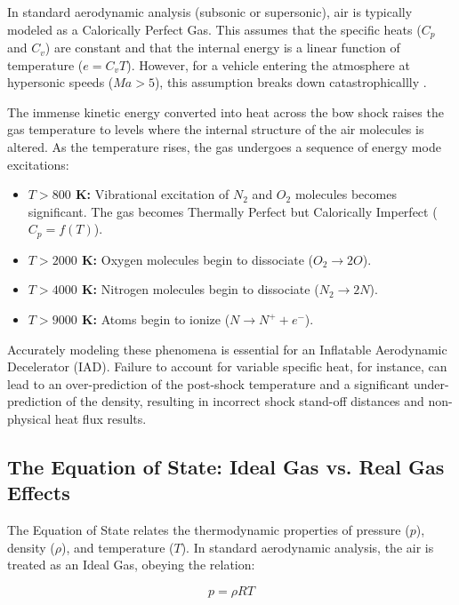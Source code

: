 \par
In standard aerodynamic analysis (subsonic or supersonic), air is typically modeled as a Calorically Perfect Gas. This assumes that the specific heats ($C_p$ and $C_v$) are constant and that the internal energy is a linear function of temperature ($e = C_v T$). However, for a vehicle entering the atmosphere at hypersonic speeds ($Ma > 5$), this assumption breaks down catastrophicallly \cite{AndersonHypersonic}.
\par
The immense kinetic energy converted into heat across the bow shock raises the gas temperature to levels where the internal structure of the air molecules is altered. As the temperature rises, the gas undergoes a sequence of energy mode excitations:
\begin{itemize}
    \item \textbf{$T > 800$ K:} Vibrational excitation of $N_2$ and $O_2$ molecules becomes significant. The gas becomes Thermally Perfect but Calorically Imperfect ($C_p = f(T)$).
    \item \textbf{$T > 2000$ K:} Oxygen molecules begin to dissociate ($O_2 \rightarrow 2O$).
    \item \textbf{$T > 4000$ K:} Nitrogen molecules begin to dissociate ($N_2 \rightarrow 2N$).
    \item \textbf{$T > 9000$ K:} Atoms begin to ionize ($N \rightarrow N^+ + e^-$).
\end{itemize}

Accurately modeling these phenomena is essential for an Inflatable Aerodynamic Decelerator (IAD). Failure to account for variable specific heat, for instance, can lead to an over-prediction of the post-shock temperature and a significant under-prediction of the density, resulting in incorrect shock stand-off distances and non-physical heat flux results.


\subsection{The Equation of State: Ideal Gas vs. Real Gas Effects}

\par
The Equation of State relates the thermodynamic properties of pressure ($p$), density ($\rho$), and temperature ($T$). In standard aerodynamic analysis, the air is treated as an Ideal Gas, obeying the relation:

\begin{equation}
    p = \rho R T
\end{equation}

